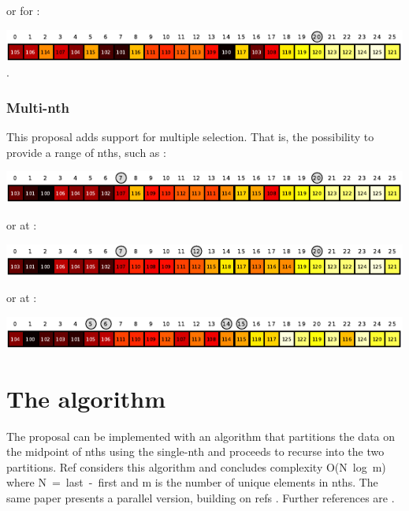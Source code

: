 or for :

\includegraphics[width=0.999\textwidth]{plotting/figs/1b.pdf}.

\subsubsection*{Multi-nth }

This proposal adds support for multiple selection. That is, the possibility to provide a range of nths, such as  :

\includegraphics[width=0.999\textwidth]{plotting/figs/2.pdf}

or at :

\includegraphics[width=0.999\textwidth]{plotting/figs/3.pdf}

or  at :

\includegraphics[width=0.999\textwidth]{plotting/figs/qs.pdf}

\newpage
\section{The algorithm}
\label{Implementation}
\label{Implement}

The proposal can be implemented with an algorithm that partitions the data on the midpoint of nths using the single-nth  and proceeds to recurse into the two partitions. Ref \cite{Alsuwaiyel2001} considers this algorithm and concludes
 complexity \mbox{O(N log m)} where \mbox{N = last - first} and m is the number of unique elements in nths.
The same paper presents a parallel version, building on refs \cite{Akl1984,Akl1989,Shen1997}. Further references are \cite{Kaligosi2006,Panh2002}.


